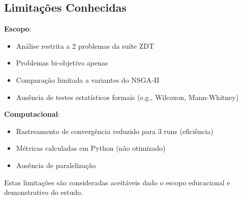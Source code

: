 \subsection{Limitações Conhecidas}

\textbf{Escopo}:
\begin{itemize}
    \item Análise restrita a 2 problemas da suíte ZDT
    \item Problemas bi-objetivo apenas
    \item Comparação limitada a variantes do NSGA-II
    \item Ausência de testes estatísticos formais (e.g., Wilcoxon, Mann-Whitney)
\end{itemize}

\textbf{Computacional}:
\begin{itemize}
    \item Rastreamento de convergência reduzido para 3 runs (eficiência)
    \item Métricas calculadas em Python (não otimizado)
    \item Ausência de paralelização
\end{itemize}

Estas limitações são consideradas aceitáveis dado o escopo educacional e demonstrativo do estudo.
